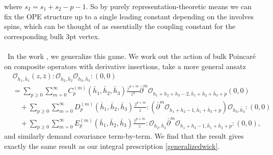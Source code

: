 \documentclass[11pt,letterpaper]{article}
\begin{document}
where $s_I = s_1+s_2-p-1$. So by purely representation-theoretic means we can fix the OPE structure up to a single leading constant depending on the involves spins, which can be thought of as essentially the coupling constant for the corresponding bulk 3pt vertex.\\
\\
\
In the work \cite{Calkins:2026hpg}, we generalize this game. We work out the action of bulk Poincar\'{e} on composite operators with derivative insertions, take a more general ansatz \begin{equation} \label{ansatz-single-particle-multi-OPE}
\begin{aligned}
& \mathcal{O}_{h_1, \bar{h}_1}(z , \bar{z} ) : \mathcal{O}_{h_2, \bar{h}_2} \mathcal{O}_{h_3,\bar{h}_3}:(0,0) \\
& = \sum_{p \geq 0} \sum_{m=0}^\infty C_p^{(m)}(\bar{h}_1, \bar{h}_2, \bar{h}_3) \frac{\bar{z}^{p+m}}{z^2} \bar{\partial}^m \mathcal{O}_{h_1+h_2+h_3-2, \bar{h}_1+\bar{h}_2+\bar{h}_3+p} (0,0) \\
& \quad + \sum_{p \geq 0} \sum_{m=0}^\infty D_p^{(m)}(\bar{h}_1, \bar{h}_2, \bar{h}_3) \frac{\bar{z}^{p+m}}{z} : \left(\bar{\partial}^m \mathcal{O}_{h_1+h_2-1, \bar{h}_1+\bar{h}_2+p} \right) \mathcal{O}_{h_3, \bar{h}_3}: (0,0)\\
&  \quad  +\sum_{p \geq 0} \sum_{m=0}^\infty E_p^{(m)}(\bar{h}_1, \bar{h}_2, \bar{h}_3) \frac{\bar{z}^{p+m}}{z} :\mathcal{O}_{h_2, \bar{h}_2}\bar{\partial}^m \mathcal{O}_{h_1+h_3-1, \bar{h}_1+\bar{h}_3+p}: (0,0),
\end{aligned}
\end{equation}
and similarly demand covariance term-by-term. We find that the result gives exactly the same result as our integral prescription \eqref{generalizedwick}.
\end{document}

